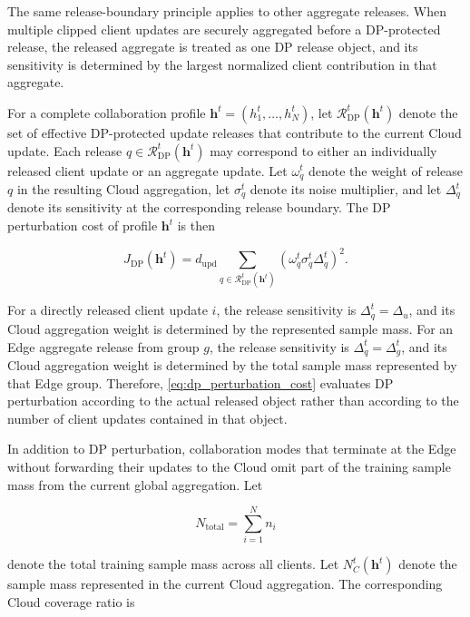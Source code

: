 \documentclass[5p,times]{elsarticle}
\theoremstyle{plain}
\theoremstyle{definition}
\theoremstyle{remark}
\begin{document}
The same release-boundary principle applies to other aggregate releases. When
multiple clipped client updates are securely aggregated before a DP-protected
release, the released aggregate is treated as one DP release object, and its
sensitivity is determined by the largest normalized client contribution in
that aggregate.

For a complete collaboration profile
\(\mathbf h^t=(h_1^t,\ldots,h_N^t)\), let
\(\mathcal R_{\mathrm{DP}}^t(\mathbf h^t)\) denote the set of effective
DP-protected update releases that contribute to the current Cloud update.
Each release \(q\in\mathcal R_{\mathrm{DP}}^t(\mathbf h^t)\) may correspond
to either an individually released client update or an aggregate update.
Let \(\omega_q^t\) denote the weight of release \(q\) in the resulting Cloud
aggregation, let \(\sigma_q^t\) denote its noise multiplier, and let
\(\Delta_q^t\) denote its sensitivity at the corresponding release boundary.
The DP perturbation cost of profile \(\mathbf h^t\) is then

\begin{equation}
J_{\mathrm{DP}}(\mathbf h^t)
=
d_{\mathrm{upd}}
\sum_{q\in\mathcal R_{\mathrm{DP}}^t(\mathbf h^t)}
\left(
\omega_q^t
\sigma_q^t
\Delta_q^t
\right)^2 .
\label{eq:dp_perturbation_cost}
\end{equation}

For a directly released client update \(i\), the release sensitivity is
\(\Delta_q^t=\Delta_u\), and its Cloud aggregation weight is determined by
the represented sample mass. For an Edge aggregate release from group \(g\),
the release sensitivity is \(\Delta_q^t=\Delta_g^t\), and its Cloud
aggregation weight is determined by the total sample mass represented by that
Edge group. Therefore, \eqref{eq:dp_perturbation_cost} evaluates DP
perturbation according to the actual released object rather than according to
the number of client updates contained in that object.

In addition to DP perturbation, collaboration modes that terminate at the Edge
without forwarding their updates to the Cloud omit part of the training sample
mass from the current global aggregation. Let

\begin{equation}
N_{\mathrm{total}}
=
\sum_{i=1}^{N} n_i
\label{eq:total_sample_mass}
\end{equation}

denote the total training sample mass across all clients. Let
\(N_C^t(\mathbf h^t)\) denote the sample mass represented in the current Cloud
aggregation. The corresponding Cloud coverage ratio is
\end{document}
